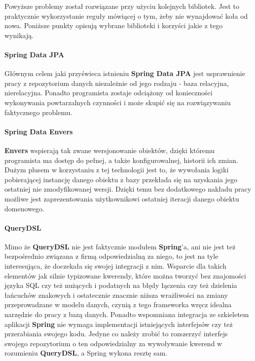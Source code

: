 			Powyższe problemy został rozwiązane przy użyciu kolejnych bibliotek. Jest to praktycznie wykorzystanie reguły mówiącej o
			tym, żeby nie wynajdować koła od nowa. Poniższe punkty opisują wybrane biblioteki i korzyści jakie z tego wynikają.
			\paragraph{Spring Data JPA}
				Głównym celem jaki przyświeca istnieniu \textbf{Spring Data JPA} jest usprawnienie pracy z repozytorium danych niezależnie
				od jego rodzaju - baza relacyjna, nierelacyjna. Ponadto programista zostaje odciążony od konieczności wykonywania powtarzalnych
				czynności i może skupić się na rozwiązywaniu faktycznego problemu.
			\paragraph{Spring Data Envers}
				\textbf{Envers} wspierają tak zwane wersjonowanie obiektów, dzięki któremu programista ma dostęp do pełnej, a także konfigurowalnej, 
				historii ich zmian. Dużym plusem w korzystaniu z tej technologii jest to, że wywołania logiki pobierającej instancję danego 
				obiektu z bazy przekłada się na uzyskania jego ostatniej nie zmodyfikowanej wersji. Dzięki temu bez dodatkowego nakładu pracy
				możliwe jest zaprezentowania użytkownikowi ostatniej iteracji danego obiektu domenowego. 
			\paragraph{QueryDSL}	
				Mimo że \textbf{QueryDSL} nie jest faktycznie modułem \textbf{Spring}'a, ani nie jest też bezpośrednio związana z firmą odpowiedzialną
				za niego, to jest na tyle interesująca, że doczekała się swojej integracji z nim. Wsparcie dla takich elementów jak silnie typizowane
				kwerendy, które można tworzyć bez znajomości języka SQL czy też nużących i podatnych na błędy łączenia czy też dzielenia łańcuchów
				znakowych i ostatecznie znacznie niższa wrażliwości na zmiany przeprowadzane w modelu danych, czynią z tego frameworka wręcz idealna narzędzie
				do pracy z bazą danych. Ponadto wspomniana integracja ze szkieletem aplikacji \textbf{Spring} nie wymaga implementacji istniejących
				interfejsów czy też przerabiania swojego kodu. Jedyne co należy zrobić to rozszerzyć interfejs swojego repozytorium o ten odpowiedzialny
				za wywoływanie kwerend w rozumieniu \textbf{QueryDSL}, a Spring wykona resztę sam.
				
